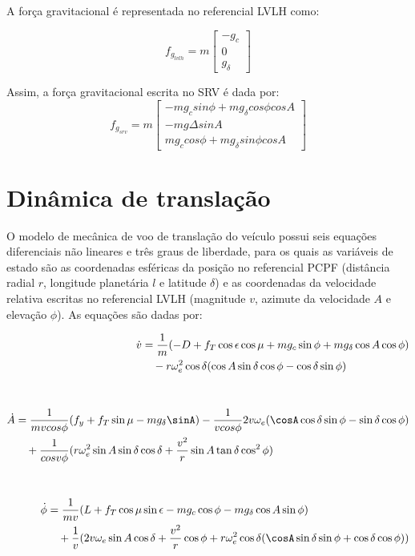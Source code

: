 A força gravitacional é representada no referencial LVLH como:

\begin{equation}
     f_{g_{lvlh}} = m \left[\begin{array}{l}
-g_{c}\\
0\\
g_{\delta}
\end{array}\right]
 \end{equation}

Assim, a força gravitacional escrita no SRV é dada por:
\begin{equation}
     f_{g_{srv}} = m \left[\begin{array}{l}
-mg_{c}sin\phi + mg_{\delta}cos\phi cos A   \\
-mg\Delta sin A\\
mg_{c}cos\phi + mg_{\delta}sin\phi cos A  
\end{array}\right]
 \end{equation}

 \section{Dinâmica de translação}

 O modelo de mecânica de voo de translação do veículo possui seis equações diferenciais não lineares e três graus de liberdade, para os quais as variáveis de estado são as coordenadas esféricas da posição no referencial PCPF (distância radial $r$, longitude planetária $l$ e latitude $\delta$) e as coordenadas da velocidade relativa escritas no referencial LVLH (magnitude $v$, azimute da velocidade $A$ e elevação $\phi$). As equações são dadas por:


    
\begin{align}
\begin{split}
\dot{v} &= \frac{1}{m} (-D+f_{T}\cos \epsilon \cos\mu + mg_{c} \sin \phi + mg_{\delta} \cos A \cos \phi)\\
&\quad -r\omega_{e}^{2} \cos \delta (\cos A \sin \delta \cos \phi - \cos\delta \sin \phi)
\end{split}\\[1cm]
\begin{split}
\dot{A} &=  \frac{1}{mvcos\phi} (f_{y}+f_{T}\sin \mu - mg_{\delta} \sinA) - \frac{1}{vcos\phi} 2v\omega_{e} (\cosA\cos\delta \sin\phi - \sin\delta \cos\phi)\\
&\quad + \frac{1}{cosv\phi} (r\omega_{e}^{2} \sin A \sin \delta \cos \delta + \frac{v^{2}}{r} \sin A \tan\delta \cos^{2}\phi)
\end{split}\\[1cm]
\begin{split}
\dot{\phi} &= \frac{1}{mv}(L+f_{T} \cos \mu \sin\epsilon - mg_{c} \cos\phi - mg_{\delta}\cos A \sin \phi )\\
&\quad + \frac{1}{v}(2v\omega_{e} \sin A \cos\delta + \frac{v^{2}}{r} \cos \phi + r\omega_{e}^{2} \cos \delta (\cosA\sin\delta \sin\phi + \cos\delta \cos \phi))
\end{split}
\end{align}

